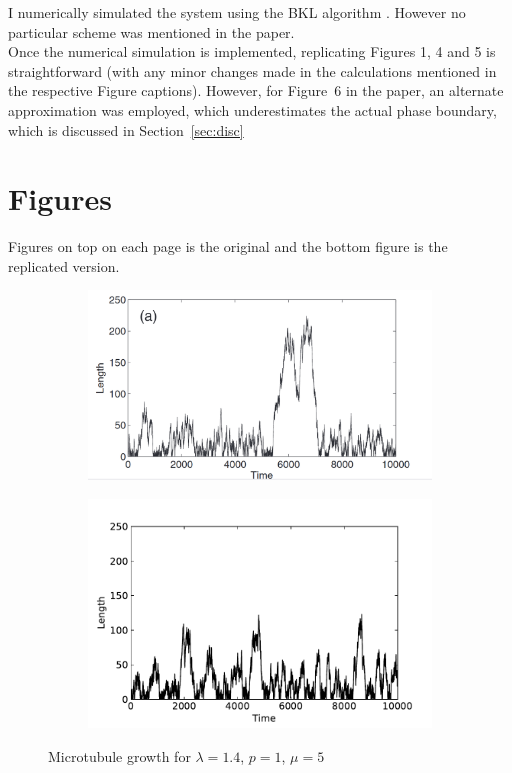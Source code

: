 \documentclass[11pt]{article}
\begin{document}
I numerically simulated the system using the BKL algorithm \citep[reviewed in, for example,][]{10.3389/fchem.2019.00202}. However no particular scheme was mentioned in the paper.\\

Once the numerical simulation is implemented, replicating Figures 1, 4 and 5 is straightforward (with any minor changes made in the calculations mentioned in the respective Figure captions). However, for Figure~6 in the paper, an alternate approximation was employed, which underestimates the actual phase boundary, which is discussed in Section~\ref{sec:disc}

\section{Figures}
\label{sec:figs}
Figures on top on each page is the original and the bottom figure is the replicated version.

\begin{figure}[!h]
\centering
\begin{subfigure}{\linewidth}
	\centering
	\includegraphics[width=\linewidth]{plots/1a.png}
\end{subfigure}
\begin{subfigure}{\linewidth}
	\centering
	\includegraphics[width=\linewidth]{plots/1a.pdf}
\end{subfigure}
\caption{Microtubule growth for $\lambda=1.4$, $p=1$, $\mu=5$}
\end{figure}
\end{document}

